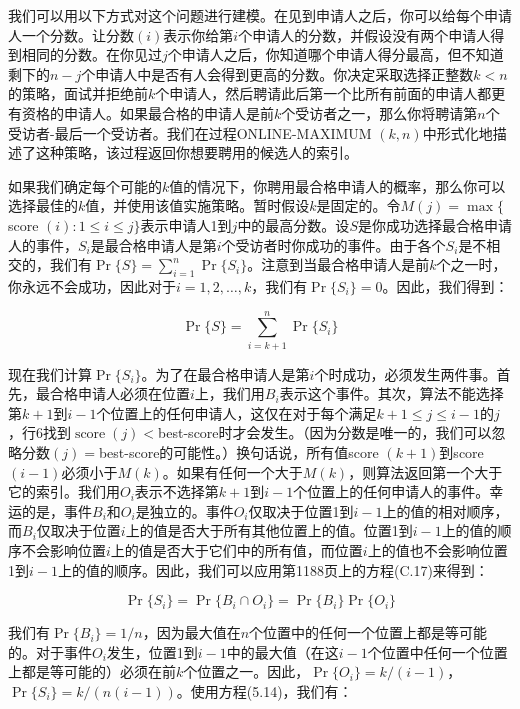 \documentclass[lang=cn,newtx,10pt,scheme=chinese]{elegantbook}
\begin{document}
我们可以用以下方式对这个问题进行建模。在见到申请人之后，你可以给每个申请人一个分数。让分数$(i)$表示你给第$i$个申请人的分数，并假设没有两个申请人得到相同的分数。在你见过$j$个申请人之后，你知道哪个申请人得分最高，但不知道剩下的$n-j$个申请人中是否有人会得到更高的分数。你决定采取选择正整数$k<n$的策略，面试并拒绝前$k$个申请人，然后聘请此后第一个比所有前面的申请人都更有资格的申请人。如果最合格的申请人是前$k$个受访者之一，那么你将聘请第$n$个受访者-最后一个受访者。我们在过程ONLINE-MAXIMUM $(k, n)$中形式化地描述了这种策略，该过程返回你想要聘用的候选人的索引。

如果我们确定每个可能的$k$值的情况下，你聘用最合格申请人的概率，那么你可以选择最佳的$k$值，并使用该值实施策略。暂时假设$k$是固定的。令$M(j)=\max \{$ score $(i): 1 \leq i \leq j\}$表示申请人1到$j$中的最高分数。设$S$是你成功选择最合格申请人的事件，$S_i$是最合格申请人是第$i$个受访者时你成功的事件。由于各个$S_i$是不相交的，我们有$\operatorname{Pr}\{S\}=\sum_{i=1}^n \operatorname{Pr}\{S_i\}$。注意到当最合格申请人是前$k$个之一时，你永远不会成功，因此对于$i=1,2, \ldots, k$，我们有$\operatorname{Pr}\{S_i\}=0$。因此，我们得到：

$$
\operatorname{Pr}\{S\}=\sum_{i=k+1}^n \operatorname{Pr}\{S_i\}
$$

现在我们计算$\operatorname{Pr}\{S_i\}$。为了在最合格申请人是第$i$个时成功，必须发生两件事。首先，最合格申请人必须在位置$i$上，我们用$B_i$表示这个事件。其次，算法不能选择第$k+1$到$i-1$个位置上的任何申请人，这仅在对于每个满足$k+1 \leq j \leq i-1$的$j$，行6找到$\operatorname{score}(j)<$best-score时才会发生。（因为分数是唯一的，我们可以忽略分数$(j)=$best-score的可能性。）换句话说，所有值score $(k+1)$到score $(i-1)$必须小于$M(k)$。如果有任何一个大于$M(k)$，则算法返回第一个大于它的索引。我们用$O_i$表示不选择第$k+1$到$i-1$个位置上的任何申请人的事件。幸运的是，事件$B_i$和$O_i$是独立的。事件$O_i$仅取决于位置1到$i-1$上的值的相对顺序，而$B_i$仅取决于位置$i$上的值是否大于所有其他位置上的值。位置1到$i-1$上的值的顺序不会影响位置$i$上的值是否大于它们中的所有值，而位置$i$上的值也不会影响位置1到$i-1$上的值的顺序。因此，我们可以应用第1188页上的方程(C.17)来得到：

$$
\operatorname{Pr}\{S_i\}=\operatorname{Pr}\{B_i \cap O_i\}=\operatorname{Pr}\{B_i\} \operatorname{Pr}\{O_i\}
$$

我们有$\operatorname{Pr}\{B_i\}=1 / n$，因为最大值在$n$个位置中的任何一个位置上都是等可能的。对于事件$O_i$发生，位置1到$i-1$中的最大值（在这$i-1$个位置中任何一个位置上都是等可能的）必须在前$k$个位置之一。因此，$\operatorname{Pr}\{O_i\}=k /(i-1)$，$\operatorname{Pr}\{S_i\}=k /(n(i-1))$。使用方程(5.14)，我们有：
\end{document}
